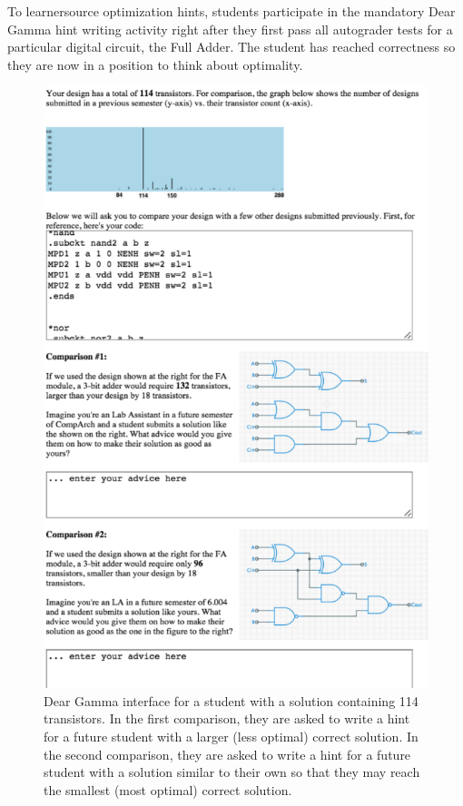 To learnersource optimization hints, students participate in the mandatory Dear Gamma hint writing activity right after they first pass all autograder tests for a particular digital circuit, the Full Adder. The student has reached correctness so they are now in a position to think about optimality. %

\begin{figure}
\centering
\includegraphics[width=0.70\columnwidth]{Body/figures/classoverflow/deargamma_shortened.png}
\caption{Dear Gamma interface for a student with a solution containing 114 transistors. In the first comparison, they are asked to write a hint for a future student with a larger (less optimal) correct solution. In the second comparison, they are asked to write a hint for a future student with a solution similar to their own so that they may reach the smallest (most optimal) correct solution.}
\label{fig:deargamma}
\end{figure}


